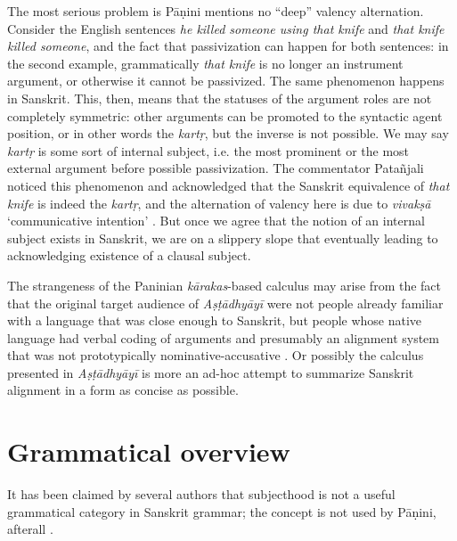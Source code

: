 \documentclass[a4paper, oneside, 12pt]{report}
\newcommand{\form}[1]{\emph{#1}}
\newcommand{\translate}[1]{`#1'}
\begin{document}
The most serious problem is Pāṇini mentions no ``deep'' valency alternation.
Consider the English sentences \form{he killed someone using that knife} 
and \form{that knife killed someone},
and the fact that passivization can happen for both sentences:
in the second example, grammatically \form{that knife} is no longer an instrument argument,
or otherwise it cannot be passivized.
The same phenomenon happens in Sanskrit.
This, then, means that the statuses of the argument roles are not completely symmetric:
other arguments can be promoted to the syntactic agent position, or in other words the \form{kartṛ},
but the inverse is not possible.
We may say \form{kartṛ} is some sort of internal subject,
i.e. the most prominent or the most external argument before possible passivization.
The commentator Patañjali noticed this phenomenon and
acknowledged that the Sanskrit equivalence of \form{that knife} is indeed the \form{kartṛ},
and the alternation of valency here is due to \form{vivakṣā} \translate{communicative intention}
\citep{keidan2017subjecthood}.
But once we agree that the notion of an internal subject exists in Sanskrit,
we are on a slippery slope that eventually leading to acknowledging 
existence of a clausal subject.

The strangeness of the Paninian \form{kārakas}-based calculus may arise from the fact
that the original target audience of \form{Aṣṭādhyāyī} were not people already familiar with a language that was close enough to Sanskrit,
but people whose native language had verbal coding of arguments and
presumably an alignment system that was not prototypically nominative-accusative
\citep{keidan2017subjecthood}.
Or possibly the calculus presented in \form{Aṣṭādhyāyī} is more an ad-hoc attempt to summarize Sanskrit alignment
in a form as concise as possible.

\chapter{Grammatical overview}

It has been claimed by several authors that subjecthood is not a useful grammatical category in Sanskrit grammar;
the concept is not used by Pāṇini, afterall \citep{keidan2017subjecthood,kiparsky2009architecture}. 




\end{document}
